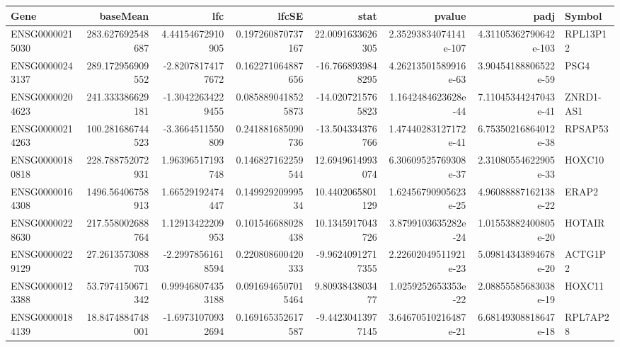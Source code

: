 \begin{center}
\begin{tabular}{lrrrrrrl}
Gene & baseMean & lfc & lfcSE & stat & pvalue & padj & Symbol\\
\hline
ENSG00000215030 & 283.627692548687 & 4.44154672910905 & 0.197260870737167 & 22.0091633626305 & 2.35293834074141e-107 & 4.31105362790642e-103 & RPL13P12\\
ENSG00000243137 & 289.172956909552 & -2.82078174177672 & 0.162271064887656 & -16.7668939848295 & 4.26213501589916e-63 & 3.90454188806522e-59 & PSG4\\
ENSG00000204623 & 241.333386629181 & -1.30422634229455 & 0.0858890418525873 & -14.0207215765823 & 1.1642484623628e-44 & 7.11045344247043e-41 & ZNRD1-AS1\\
ENSG00000214263 & 100.281686744523 & -3.3664511550809 & 0.241881685090736 & -13.504334376766 & 1.47440283127172e-41 & 6.75350216864012e-38 & RPSAP53\\
ENSG00000180818 & 228.788752072931 & 1.96396517193748 & 0.146827162259544 & 12.6949614993074 & 6.30609525769308e-37 & 2.31080554622905e-33 & HOXC10\\
ENSG00000164308 & 1496.56406758913 & 1.66529192474447 & 0.14992920999534 & 10.4402065801129 & 1.62456790905623e-25 & 4.96088887162138e-22 & ERAP2\\
ENSG00000228630 & 217.558002688764 & 1.12913422209953 & 0.101546688028438 & 10.1345917043726 & 3.8799103635282e-24 & 1.01553882400805e-20 & HOTAIR\\
ENSG00000229129 & 27.2613573088703 & -2.29978561618594 & 0.220808600420333 & -9.96240912717355 & 2.22602049511921e-23 & 5.09814343894678e-20 & ACTG1P2\\
ENSG00000123388 & 53.7974150671342 & 0.999468074353188 & 0.0916946507015464 & 9.8093843803477 & 1.0259252653353e-22 & 2.08855585683038e-19 & HOXC11\\
ENSG00000184139 & 18.8474884748001 & -1.69731070932694 & 0.169165352617587 & -9.44230413977145 & 3.64670510216487e-21 & 6.68149308818647e-18 & RPL7AP28\\
\end{tabular}
\end{center}


